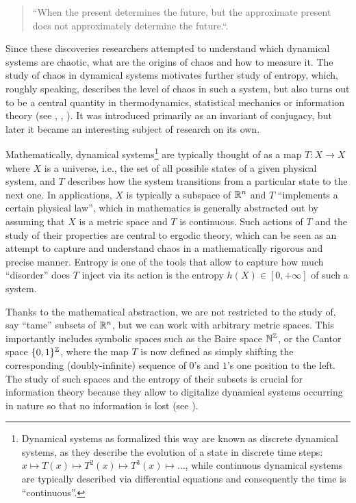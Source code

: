 %
\begin{quote} 
\centering 
``When the present determines the future, but the approximate present does not approximately determine the future.``.
\end{quote}
%
Since these discoveries researchers attempted to understand which dynamical systems are chaotic, what are the origins of chaos and how to measure it. 
%
The study of chaos in dynamical systems motivates further study of entropy, which, roughly speaking, describes the level of chaos in such a system, but also turns out to be a central quantity in thermodynamics, statistical mechanics or information theory (see \cite{Downarowicz11}, \cite{Downarowicz}, \cite{MM09}).
%
It was introduced primarily as an invariant of conjugacy, but later it became an interesting subject of research on its own.


Mathematically, dynamical systems\footnote{Dynamical systems as formalized this way are known as discrete dynamical systems, as they describe the evolution of a state in discrete time steps: $x\mapsto T(x) \mapsto T^2(x) \mapsto T^3(x) \mapsto \ldots$, while continuous dynamical systems are typically described via differential equations and consequently the time is ``continuous''.} are typically thought of as a map $T: X \to X$ where $X$ is a universe, i.e., the set of all possible states of a given physical system, and $T$ describes how the system transitions from a particular state to the next one.
%
 In applications, $X$ is typically a subspace of $\mathbb{R}^n$ and $T$ ``implements
 a certain physical law'', which in mathematics is generally abstracted out by assuming that $X$ is a metric space and $T$ is continuous.
Such actions of $T$ and the study of their properties are central to ergodic theory, which can be seen as an attempt to capture and understand chaos in a mathematically rigorous and precise manner. 
%
Entropy is one of the tools that allow to capture how much ``disorder'' does $T$ inject via its action is the entropy $h(X)\in [0,+\infty]$ of such a system.

Thanks to the mathematical abstraction, we are not restricted to the study of, say ``tame'' subsets of $\mathbb{R}^n$, but we can work with arbitrary metric spaces.
%
This importantly includes symbolic spaces such as the Baire space $\mathbb{N}^{\mathbb{Z}}$, or the Cantor space $\{0,1\}^{\mathbb{Z}}$, where the map $T$ is now defined as simply shifting the corresponding (doubly-infinite) sequence of $0$'s and $1$'s one position to the left.
%
The study of such spaces and the entropy of their subsets is crucial for information theory because they allow to digitalize dynamical systems occurring in nature so that no information is lost (see \cite{Downarowicz11}).
%

